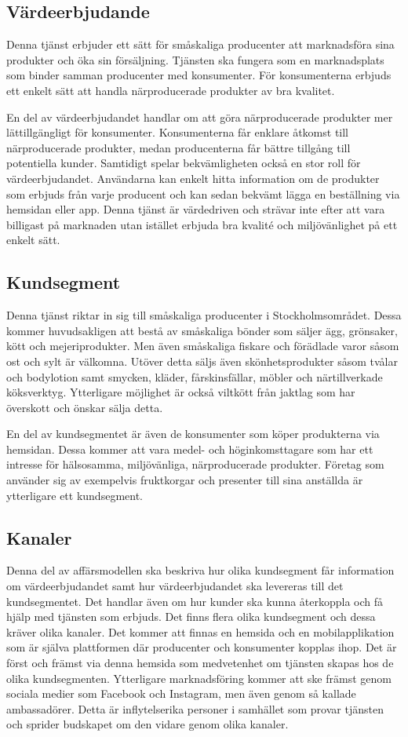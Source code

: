 \documentclass[10pt,a4paper,oneside]{article}
\begin{document}
\subsection{Värdeerbjudande}
Denna tjänst erbjuder ett sätt för småskaliga producenter att marknadsföra sina produkter och öka sin försäljning. Tjänsten ska fungera som en marknadsplats som binder samman producenter med konsumenter. För konsumenterna erbjuds ett enkelt sätt att handla närproducerade produkter av bra kvalitet. 

En del av värdeerbjudandet handlar om att göra närproducerade produkter mer lättillgängligt för konsumenter. Konsumenterna får enklare åtkomst till närproducerade produkter, medan producenterna får bättre tillgång till potentiella kunder. Samtidigt spelar bekvämligheten också en stor roll för värdeerbjudandet. Användarna kan enkelt hitta information om de produkter som erbjuds från varje producent och kan sedan bekvämt lägga en beställning via hemsidan eller app. Denna tjänst är värdedriven och strävar inte efter att vara billigast på marknaden utan istället erbjuda bra kvalité och miljövänlighet på ett enkelt sätt.  


\subsection{Kundsegment}
Denna tjänst riktar in sig till småskaliga producenter i Stockholmsområdet. Dessa kommer huvudsakligen att bestå av småskaliga bönder som säljer ägg, grönsaker, kött och mejeriprodukter. Men även småskaliga fiskare och förädlade varor såsom ost och sylt är välkomna. Utöver detta säljs även skönhetsprodukter såsom tvålar och bodylotion samt smycken, kläder, fårskinsfällar, möbler och närtillverkade köksverktyg. Ytterligare möjlighet är också viltkött från jaktlag som har överskott och önskar sälja detta. 

En del av kundsegmentet är även de konsumenter som köper produkterna via hemsidan. Dessa kommer att vara medel- och höginkomsttagare som har ett intresse för hälsosamma, miljövänliga, närproducerade produkter. Företag som använder sig av exempelvis fruktkorgar och presenter till sina anställda är ytterligare ett kundsegment. 

\subsection{Kanaler}
Denna del av affärsmodellen ska beskriva hur olika kundsegment får information om värdeerbjudandet samt hur värdeerbjudandet ska levereras till det kundsegmentet. Det handlar även om hur kunder ska kunna återkoppla och få hjälp med tjänsten som erbjuds. Det finns flera olika kundsegment och dessa kräver olika kanaler. Det kommer att finnas en hemsida och en mobilapplikation som är själva plattformen där producenter och konsumenter kopplas ihop. Det är först och främst via denna hemsida som medvetenhet om tjänsten skapas hos de olika kundsegmenten. Ytterligare marknadsföring kommer att ske främst genom sociala medier som Facebook och Instagram, men även genom så kallade ambassadörer. Detta är inflytelserika personer i samhället som provar tjänsten och sprider budskapet om den vidare genom olika kanaler.
\end{document}
